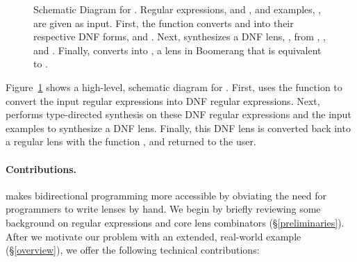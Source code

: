 \documentclass[sigplan,acmsmall]{acmart}
\begin{document}
\begin{figure}
\begin{tikzpicture}[auto,node distance=1.5cm]
  \end{tikzpicture}
  \caption{Schematic Diagram for \Optician{}.  Regular expressions, \Regex{} and
    \RegexAlt{}, and examples, \Examples{}, are given as input.
    First, the function \ToDNFRegex{} converts \Regex{} and \RegexAlt{} into
    their respective DNF forms, \DNFRegex{} and \DNFRegexAlt{}.
    Next, \SynthDNFLens{} synthesizes a DNF lens, \DNFLens{}, from \Regex{},
    \RegexAlt{}, and \Examples{}.
    Finally, \ToLens{} converts \DNFLens{} into \Lens{}, a lens in Boomerang
    that is equivalent to \DNFLens{}.}
  \label{fig:schematic-diagram-synthesis}
\end{figure}

Figure~\ref{fig:schematic-diagram-synthesis} shows a high-level,
schematic diagram for \Optician{}.
First, \Optician{} uses the function \ToDNFRegex{} to convert the input
regular expressions into DNF regular expressions.  Next,
\SynthDNFLens{} performs type-directed synthesis on these DNF regular
expressions and the input examples to synthesize a DNF lens.  Finally, this DNF lens is
converted back into a regular lens with the function \ToLens{}, and returned to the user.

\paragraph*{Contributions.}  \Optician{} makes
bidirectional programming more accessible by obviating the need for
programmers to write lenses by hand.
We begin by briefly reviewing some background on regular expressions and core
lens combinators (\S\ref{preliminaries}).
After we motivate our problem
with an extended, real-world example (\S\ref{overview}),
we offer the following technical contributions:
\end{document}
